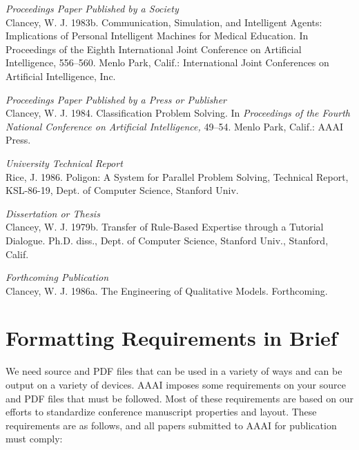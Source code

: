 \documentclass[letterpaper]{article}
\begin{document}
\smallskip \noindent \textit{Proceedings Paper Published by a Society}\\
Clancey, W. J. 1983b. Communication, Simulation, and Intelligent Agents: Implications of Personal Intelligent Machines for Medical Education. In Proceedings of the Eighth International Joint Conference on Artificial Intelligence, 556--560. Menlo Park, Calif.: International Joint Conferences on Artificial Intelligence, Inc.

\smallskip \noindent \textit{Proceedings Paper Published by a Press or Publisher}\\
Clancey, W. J. 1984. Classification Problem Solving. In \textit{Proceedings of the Fourth National Conference on Artificial Intelligence,} 49--54. Menlo Park, Calif.: AAAI Press. 

\smallskip \noindent \textit{University Technical Report}\\
Rice, J. 1986. Poligon: A System for Parallel Problem Solving, Technical Report, KSL-86-19, Dept. of Computer Science, Stanford Univ. 

\smallskip \noindent \textit{Dissertation or Thesis}\\
Clancey, W. J. 1979b. Transfer of Rule-Based Expertise through a Tutorial Dialogue. Ph.D. diss., Dept. of Computer Science, Stanford Univ., Stanford, Calif.

\smallskip \noindent \textit{Forthcoming Publication}\\
Clancey, W. J. 1986a. The Engineering of Qualitative Models. Forthcoming.


\section{Formatting Requirements in Brief}
We need source and PDF files that can be used in a variety of ways and can be output on a variety of devices. AAAI imposes some requirements on your source and PDF files that must be followed. Most of these requirements are based on our efforts to standardize conference manuscript properties and layout. These requirements are as follows, and all papers submitted to AAAI for publication must comply:
\end{document}
